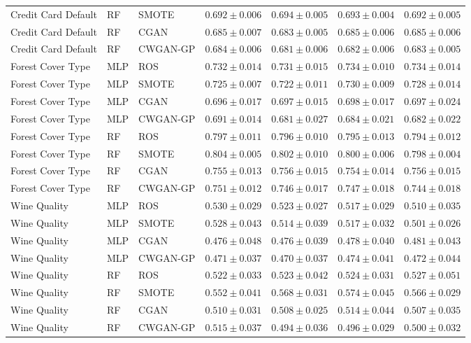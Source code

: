 \begin{table}[htbp]
\begin{adjustbox}{max width=\textwidth}
\begin{tabular}{lllcccc}
Credit Card Default & RF & SMOTE & $0.692\pm0.006$ & $0.694\pm0.005$ & $0.693\pm0.004$ & $0.692\pm0.005$ \\
Credit Card Default & RF & CGAN & $0.685\pm0.007$ & $0.683\pm0.005$ & $0.685\pm0.006$ & $0.685\pm0.006$ \\
Credit Card Default & RF & CWGAN-GP & $0.684\pm0.006$ & $0.681\pm0.006$ & $0.682\pm0.006$ & $0.683\pm0.005$ \\
\midrule
Forest Cover Type & MLP & ROS & $0.732\pm0.014$ & $0.731\pm0.015$ & $0.734\pm0.010$ & $0.734\pm0.014$ \\
Forest Cover Type & MLP & SMOTE & $0.725\pm0.007$ & $0.722\pm0.011$ & $0.730\pm0.009$ & $0.728\pm0.014$ \\
Forest Cover Type & MLP & CGAN & $0.696\pm0.017$ & $0.697\pm0.015$ & $0.698\pm0.017$ & $0.697\pm0.024$ \\
Forest Cover Type & MLP & CWGAN-GP & $0.691\pm0.014$ & $0.681\pm0.027$ & $0.684\pm0.021$ & $0.682\pm0.022$ \\
Forest Cover Type & RF & ROS & $0.797\pm0.011$ & $0.796\pm0.010$ & $0.795\pm0.013$ & $0.794\pm0.012$ \\
Forest Cover Type & RF & SMOTE & $0.804\pm0.005$ & $0.802\pm0.010$ & $0.800\pm0.006$ & $0.798\pm0.004$ \\
Forest Cover Type & RF & CGAN & $0.755\pm0.013$ & $0.756\pm0.015$ & $0.754\pm0.014$ & $0.756\pm0.015$ \\
Forest Cover Type & RF & CWGAN-GP & $0.751\pm0.012$ & $0.746\pm0.017$ & $0.747\pm0.018$ & $0.744\pm0.018$ \\
\midrule
Wine Quality & MLP & ROS & $0.530\pm0.029$ & $0.523\pm0.027$ & $0.517\pm0.029$ & $0.510\pm0.035$ \\
Wine Quality & MLP & SMOTE & $0.528\pm0.043$ & $0.514\pm0.039$ & $0.517\pm0.032$ & $0.501\pm0.026$ \\
Wine Quality & MLP & CGAN & $0.476\pm0.048$ & $0.476\pm0.039$ & $0.478\pm0.040$ & $0.481\pm0.043$ \\
Wine Quality & MLP & CWGAN-GP & $0.471\pm0.037$ & $0.470\pm0.037$ & $0.474\pm0.041$ & $0.472\pm0.044$ \\
Wine Quality & RF & ROS & $0.522\pm0.033$ & $0.523\pm0.042$ & $0.524\pm0.031$ & $0.527\pm0.051$ \\
Wine Quality & RF & SMOTE & $0.552\pm0.041$ & $0.568\pm0.031$ & $0.574\pm0.045$ & $0.566\pm0.029$ \\
Wine Quality & RF & CGAN & $0.510\pm0.031$ & $0.508\pm0.025$ & $0.514\pm0.044$ & $0.507\pm0.035$ \\
Wine Quality & RF & CWGAN-GP & $0.515\pm0.037$ & $0.494\pm0.036$ & $0.496\pm0.029$ & $0.500\pm0.032$ \\
\bottomrule
\end{tabular}
\end{adjustbox}
\end{table}